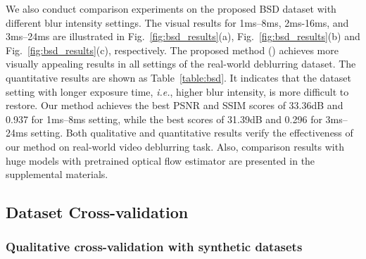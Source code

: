 \documentclass[twocolumn]{svjour3}          \smartqed  \usepackage{graphicx}
\begin{document}
\begin{figure*}[!ht]
	\centering
{}
	\hfil
	\hfil
	\hfil
	\caption{Visual comparisons on different settings of the proposed BSD.}
	\label{fig:bsd_results}
\end{figure*}

We also conduct comparison experiments on the proposed BSD dataset with different blur intensity settings. The visual results for 1ms--8ms, 2ms-16ms, and 3ms--24ms are illustrated in Fig.~\ref{fig:bsd_results}(a), Fig.~\ref{fig:bsd_results}(b) and Fig.~\ref{fig:bsd_results}(c), respectively. The proposed method () achieves more visually appealing results in all settings of the real-world deblurring dataset. The quantitative results are shown as Table~\ref{table:bsd}. It indicates that the dataset setting with longer exposure time, \textit{i.e.}, higher blur intensity, is more difficult to restore. Our method achieves the best PSNR and SSIM scores of 33.36dB and 0.937 for 1ms--8ms setting, while the best scores of 31.39dB and 0.296 for 3ms--24ms setting. Both qualitative and quantitative results verify the effectiveness of our method on real-world video deblurring task. Also, comparison results with huge models with pretrained optical flow estimator are presented in the supplemental materials.

\subsection{Dataset Cross-validation}

\subsubsection{Qualitative cross-validation with synthetic datasets}

\begin{figure*}[!ht]
	\centering
{}
	\hfil
	\caption{Cross-validation between BSD and GOPRO.}
	\label{fig:cross_bsd_gopro}
\end{figure*}
\end{document}

